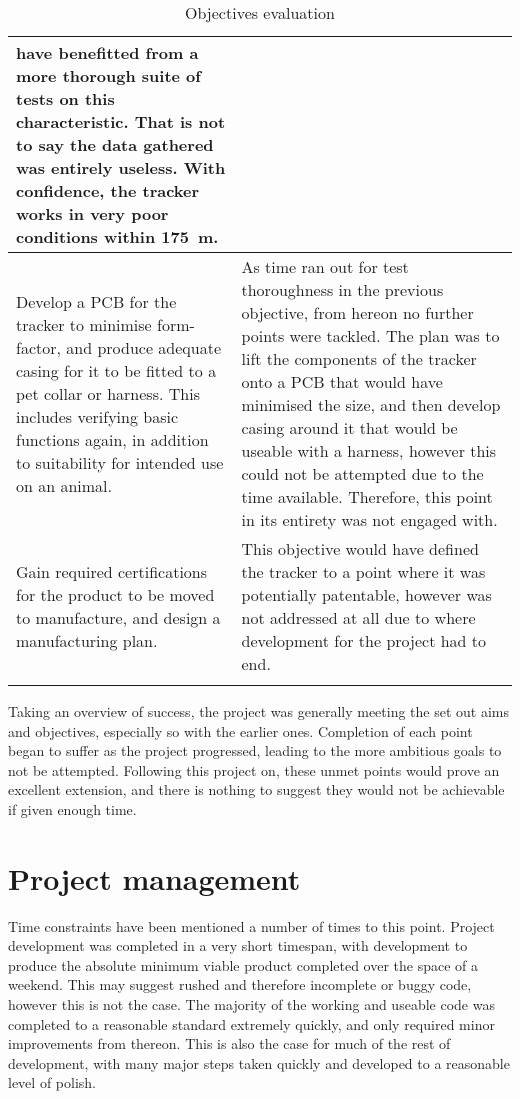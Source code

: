 \documentclass[11pt]{article}
\begin{document}
{\begin{xltabular}{\linewidth}{|>{\raggedright\arraybackslash}p{5cm}|>{\color{white}}Z|}
        have benefitted from a more thorough suite of tests on this characteristic. That is not to say the data gathered was entirely useless. 
        With confidence, the tracker works in very poor conditions within \qty{175}{\m}. \\ \hline
    Develop a PCB for the tracker to minimise form-factor, and produce adequate casing
        for it to be fitted to a pet collar or harness. This includes verifying basic functions
        again, in addition to suitability for intended use on an animal. & As time ran out for test thoroughness in the previous 
        objective, from hereon no further points were tackled. The plan was to lift the components of the tracker onto a PCB that 
        would have minimised the size, and then develop casing around it that would be useable with a harness, however this could not be attempted 
        due to the time available. Therefore, this point in its entirety was not engaged with. \\ \hline
    Gain required certifications for the product to be moved to manufacture, and design
        a manufacturing plan. & This objective would have defined the tracker to a point where it was potentially patentable,
        however was not addressed at all due to where development for the project had to end.  \\ \hline
    
    \caption{Objectives evaluation}\label{table:objeval}
\end{xltabular}
\vspace{-11pt}
}

Taking an overview of success, the project was generally meeting the set out aims and 
objectives, especially so with the earlier ones. Completion of each point began to suffer 
as the project progressed, leading to the more ambitious goals to not be attempted. 
Following this project on, these unmet points would prove an excellent extension, and 
there is nothing to suggest they would not be achievable if given enough time. 

\section{Project management}
Time constraints have been mentioned a number of times to this point. 
Project development was completed in a very short timespan, with development to produce 
the absolute minimum viable product completed over the space of a weekend. 
This may suggest rushed and therefore incomplete or buggy code, however this is not the case.
The majority of the working and useable code was completed to a reasonable standard extremely quickly, 
and only required minor improvements from thereon. 
This is also the case for much of the rest of development, with many major steps taken quickly and developed to a reasonable
level of polish. 
\end{document}
